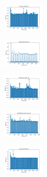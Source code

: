 \vspace*{\fill}
\newpage
\vspace*{\fill}

\begin{figure}[H]    
    \centering
    \begin{subfigure}
        \centering
        \includegraphics[width=0.234\textwidth]{img/am10/iris_set_const_10_949004259_time.png}
    \end{subfigure}
    \hfill
    \begin{subfigure}
        \centering
        \includegraphics[width=0.234\textwidth]{img/am10/ecoli_set_const_10_949004259_time.png}
    \end{subfigure}
    \hfill
    \begin{subfigure}
        \centering
        \includegraphics[width=0.234\textwidth]{img/am10/rand_set_const_10_949004259_time.png}
    \end{subfigure}
    \hfill
    \begin{subfigure}
        \centering
        \includegraphics[width=0.234\textwidth]{img/am10/newthyroid_set_const_10_949004259_time.png}
    \end{subfigure}
    \hfill
    \begin{subfigure}
        \centering
        \includegraphics[width=0.234\textwidth]{img/am10/iris_set_const_10_589741062_time.png}

\end{subfigure}
\end{figure}

